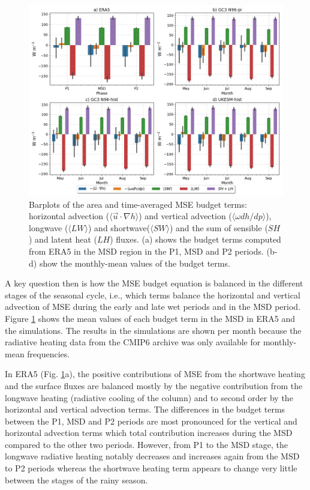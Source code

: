 

\begin{figure}[t!]
\includegraphics[width=\linewidth]{figures/mse_barplot_era5}
\caption[Barplots of MSE budget terms]{Barplots of the area and time-averaged MSE budget terms: horizontal advection ($\langle \vec{u}\cdot\nabla h \rangle$) and vertical advection ($\langle \omega dh/dp \rangle$), longwave ($\langle LW \rangle$) and shortwave($\langle SW \rangle$) and the sum of sensible ($SH$) and latent heat ($LH$) fluxes. (a) shows the budget terms computed from ERA5 in the MSD region in the P1, MSD and P2 periods. (b-d) show the monthly-mean values of the budget terms. }
\label{fig:thermo_barplot}
\end{figure}

A key question then is how the MSE budget equation is balanced in the different stages of the seasonal cycle, i.e., which terms balance the horizontal and vertical advection of MSE during the early and late wet periods and in the MSD period. 
Figure \ref{fig:thermo_barplot} shows the mean values of each budget term in the MSD in ERA5 and the simulations. The results in the simulations are shown per month because the radiative heating data from the CMIP6 archive was only available for monthly-mean frequencies.

In ERA5 (Fig. \ref{fig:thermo_barplot}a), the positive contributions of MSE from the shortwave heating and the surface fluxes are balanced mostly by the negative contribution from the longwave heating (radiative cooling of the column)  and to second order by the horizontal and vertical advection terms. 
The differences in the budget terms between the P1, MSD and P2 periods are most pronounced for the vertical and horizontal advection terms which total contribution increases during the MSD compared to the other two periods. However, from P1 to the MSD stage, the longwave radiative heating notably decreases and increases again from the MSD to P2 periods whereas the shortwave heating term appears to change very little between the stages of the rainy season.

